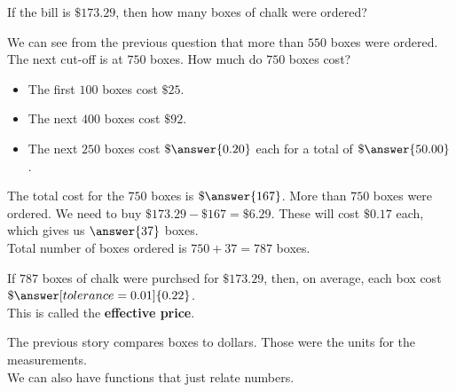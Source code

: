 \documentclass{ximera}
\begin{document}
\begin{question}
If the bill is $\$173.29$, then how many boxes of chalk were ordered?

\begin{explanation}

We can see from the previous question that more than $550$ boxes were ordered.  The next cut-off is at $750$ boxes.  How much do $750$ boxes cost? \\

\begin{itemize}
\item The first $100$ boxes cost $\$25$.
\item The next $400$ boxes cost $\$92$.
\item The next $250$ boxes cost $\$\answer{0.20}$ each for a total of $\$\answer{50.00}$.
\end{itemize}
The total cost for the $750$ boxes is $\$\answer{167}$. More than $750$ boxes were ordered.  We need to buy $\$173.29 - \$167 = \$6.29$.  These will cost $\$0.17$ each, which gives us $\answer{37}$ boxes.  \\


Total number of boxes ordered is $750 + 37 = 787$ boxes.


\end{explanation}
\end{question}



\begin{question}
If $787$ boxes of chalk were purchsed for $\$173.29$, then, on average, each box cost $\$\answer[tolerance=0.01]{0.22}$. \\

This is called the \textbf{effective price}.
\end{question}



The previous story compares boxes to dollars.  Those were the units for the measurements. \\



We can also have functions that just relate numbers. \\
\end{document}
